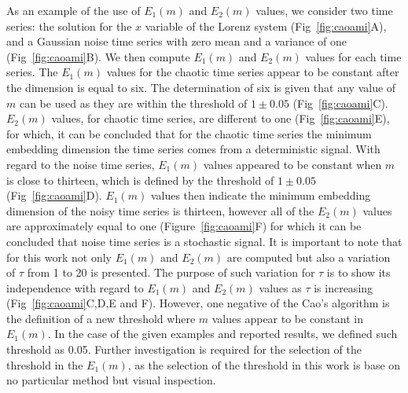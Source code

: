 \documentclass[fleqn,10pt]{wlscirep}
\begin{document}
As an example of the use of $E_1(m)$ and $E_2(m)$ values, we consider two time 
series: the solution for the $x$ variable of the Lorenz system 
(Fig~\ref{fig:caoami}A), and a Gaussian noise time series with zero mean 
and a variance of one (Fig~\ref{fig:caoami}B).
We then compute $E_1(m)$ and $E_2(m)$ values for each time series.
The $E_1(m)$ values for the chaotic time series appear to be constant
after the dimension is equal to six.
The determination of six is given that any value of $m$ can be used as they 
are within the threshold of $1\pm0.05$ (Fig~\ref{fig:caoami}C).
$E_2(m)$ values, for chaotic time series, are different to one 
(Fig~\ref{fig:caoami}E), for which, it can be concluded that for the 
chaotic time series the minimum embedding dimension the time series 
comes from a deterministic signal. With regard to the noise time series,  
$E_1(m)$ values appeared to be constant when $m$ is close to thirteen, 
which is defined by the threshold of $1\pm0.05$ (Fig~\ref{fig:caoami}D).
$E_1(m)$ values then indicate the minimum embedding dimension of the 
noisy time series is thirteen, however all of the $E_2(m)$ values are 
approximately equal to one (Figure~\ref{fig:caoami}F) for which it can be 
concluded that noise time series is a stochastic signal.
It is important to note that for this work not only $E_1(m)$ and $E_2(m)$ are 
computed but also a variation of $\tau$ from 1 to 20 is presented. 
The purpose of such variation for $\tau$ is to show its independence with
regard to $E_1(m)$ and $E_2(m)$ values as $\tau$ is increasing 
(Fig~\ref{fig:caoami}C,D,E and F). 
However, one negative of the Cao's algorithm \cite{Cao1997} is the definition of 
a new threshold where $m$ values appear to be constant in $E_1 (m)$.
In the case of the given examples and reported results, we defined such 
threshold as 0.05. Further investigation is required for the selection of the 
threshold in the $E_1(m)$, as the selection of the threshold in this work is 
base on no particular method but visual inspection.

\end{document}
